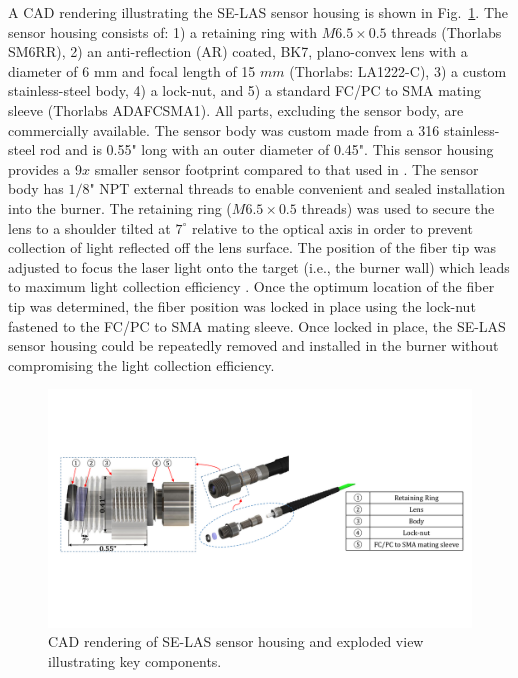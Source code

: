A CAD rendering illustrating the SE-LAS sensor housing is shown in Fig.\ \ref{fig:ch4_4}. The sensor housing consists of: 1) a retaining ring with $M6.5\times 0.5$ threads (Thorlabs SM6RR), 2) an anti-reflection (AR) coated, BK7, plano-convex lens with a diameter of 6 mm and focal length of 15 $mm$ (Thorlabs: LA1222-C), 3) a custom stainless-steel body, 4) a lock-nut, and 5) a standard FC/PC to SMA mating sleeve (Thorlabs ADAFCSMA1). All parts, excluding the sensor body, are commercially available. The sensor body was custom made from a 316 stainless-steel rod and is 0.55" long with an outer diameter of 0.45". This sensor housing provides a 9$x$ smaller sensor footprint compared to that used in \cite{Goldenstein:16}. The sensor body has $1/8$" NPT external threads to enable convenient and sealed installation into the burner. The retaining ring ($M6.5 \times 0.5$ threads) was used to secure the lens to a shoulder tilted at $7^{\circ}$ relative to the optical axis in order to prevent collection of light reflected off the lens surface. The position of the fiber tip was adjusted to focus the laser light onto the target (i.e., the burner wall) which leads to maximum light collection efficiency \cite{Goldenstein:16}. Once the optimum location of the fiber tip was determined, the fiber position was locked in place using the lock-nut fastened to the FC/PC to SMA mating sleeve. Once locked in place, the SE-LAS sensor housing could be repeatedly removed and installed in the burner without compromising the light collection efficiency.

 \begin{figure}[t]
    \centering
        \includegraphics[trim = 0mm 52mm 0mm 54mm, clip=true, width=1\textwidth]{fig/ch4_fig2.pdf}
        \caption{CAD rendering of SE-LAS sensor housing and exploded view illustrating key components.}
    \label{fig:ch4_4}
\end{figure}

